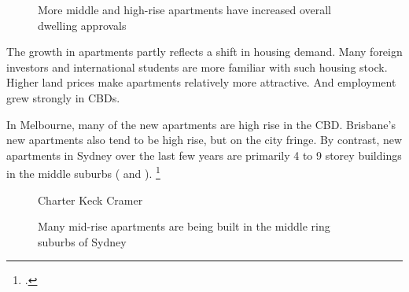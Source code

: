 \begin{figure}
\caption{More middle and high-rise apartments have increased overall dwelling approvals}\label{fig:building-approvals-type}
{\textcite{ABS-2017-Building-approvals-Sep-2015}}
\end{figure}

The growth in apartments partly reflects a shift in housing demand.
Many foreign investors and international students are more familiar with such housing stock.
Higher land prices make apartments relatively more attractive.
And employment grew strongly in CBDs.

In Melbourne, many of the new apartments are high rise in the CBD\@.
Brisbane's new apartments also tend to be high rise, but on the city fringe. By contrast, new apartments in Sydney over the last few years are primarily 4 to 9 storey buildings in the middle suburbs ( and ).%
	\footcites{KentPhibbs2017Charts}{Shoory2016Apartment}

\begin{figure}
\caption{Many mid-rise apartments are being built in the middle ring suburbs of Sydney}\label{fig:ckc-apartment-completions}
%
{Charter Keck Cramer}
\end{figure}


